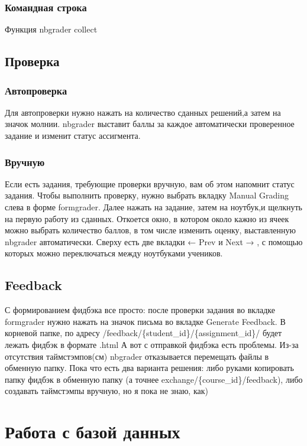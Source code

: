 \documentclass[a4paper,12pt]{article}
\begin{document}
\subsubsection{Командная строка}

Функция nbgrader collect 
\subsection{Проверка}

\subsubsection{Автопроверка}

Для автопроверки нужно нажать на количество сданных решений,а затем на значок молнии. nbgrader выставит баллы за каждое автоматически проверенное задание и изменит статус ассигмента. 
\subsubsection{Вручную}

Если есть задания, требующие проверки вручную, вам об этом напомнит статус задания. Чтобы выполнить проверку, нужно выбрать вкладку Manual Grading слева в форме formgrader. Далее нажать на задание, затем на ноутбук,и щелкнуть на первую работу из сданных. Откоется окно, в котором около кажно из ячеек можно выбрать количество баллов, в том числе изменить оценку, выставленную nbgrader автоматически. Сверху есть две вкладки ← Prev и Next → , с помощью которых можно переключаться между ноутбуками учеников.
\subsection{Feedback}

С формированием фидбэка все просто: после проверки задания во вкладке formgrader нужно нажать на значок письма во вкладке Generate Feedback. В корневой папке, по адресу /feedback/\{student\_id\}/\{assignment\_id\}/ будет лежать фидбэк в формате .html
А вот с отправкой фидбэка есть проблемы. Из-за отсутствия таймстэмпов(см) nbgrader отказывается перемещать файлы в обменную папку. Пока что есть два варианта решения: либо руками копировать папку фидбэк в обменную папку (а точнее exchange/\{course\_id\}/feedback), либо создавать таймстэмпы вручную, но я пока не знаю, как)
\section{Работа с базой данных}
\end{document}
